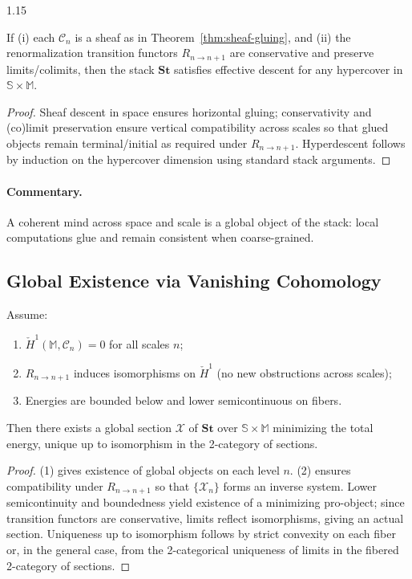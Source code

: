 \documentclass[12pt,a4paper]{article}
\begin{document}
\begin{spacing}{1.15}
\begin{theorem}
\label{thm:stack-descent}
If (i) each $\mathscr{C}_n$ is a sheaf as in Theorem~\ref{thm:sheaf-gluing}, and (ii) the renormalization transition functors $R_{n\to n+1}$ are conservative and preserve limits/colimits, then the stack $\mathbf{St}$ satisfies effective descent for any hypercover in $\mathbb{S}\times \mathbb{M}$.
\end{theorem}

\begin{proof}
Sheaf descent in space ensures horizontal gluing; conservativity and (co)limit preservation ensure vertical compatibility across scales so that glued objects remain terminal/initial as required under $R_{n\to n+1}$. Hyperdescent follows by induction on the hypercover dimension using standard stack arguments.
\end{proof}

\paragraph{Commentary.}
A coherent mind across space and scale is a global object of the stack: local computations glue and remain consistent when coarse-grained.

\subsection{Global Existence via Vanishing Cohomology}

\begin{theorem}
\label{thm:global-section}
Assume:
\begin{enumerate}[leftmargin=1.2em]
\item $\check{H}^{1}(\mathbb{M},\mathscr{C}_n)=0$ for all scales $n$;
\item $R_{n\to n+1}$ induces isomorphisms on $\check{H}^{1}$ (no new obstructions across scales);
\item Energies are bounded below and lower semicontinuous on fibers.
\end{enumerate}
Then there exists a global section $\mathcal{X}$ of $\mathbf{St}$ over $\mathbb{S}\times \mathbb{M}$ minimizing the total energy, unique up to isomorphism in the 2-category of sections.
\end{theorem}

\begin{proof}
(1) gives existence of global objects on each level $n$. (2) ensures compatibility under $R_{n\to n+1}$ so that $\{\mathcal{X}_n\}$ forms an inverse system. Lower semicontinuity and boundedness yield existence of a minimizing pro-object; since transition functors are conservative, limits reflect isomorphisms, giving an actual section. Uniqueness up to isomorphism follows by strict convexity on each fiber or, in the general case, from the 2-categorical uniqueness of limits in the fibered 2-category of sections.
\end{proof}


\end{spacing}
\end{document}
